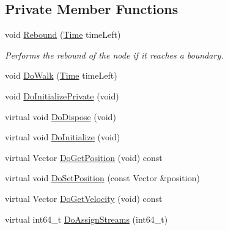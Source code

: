 \subsection*{Private Member Functions}
\begin{DoxyCompactItemize}
\item 
void \hyperlink{classns3_1_1RandomWalk2dMobilityModel_a8cf0179f7646fec7c7f167e00ceb7691}{Rebound} (\hyperlink{classns3_1_1Time}{Time} time\+Left)
\begin{DoxyCompactList}\small\item\em Performs the rebound of the node if it reaches a boundary. \end{DoxyCompactList}\item 
void \hyperlink{classns3_1_1RandomWalk2dMobilityModel_a7264a6530d2c8d2ecef04eda098db5d4}{Do\+Walk} (\hyperlink{classns3_1_1Time}{Time} time\+Left)
\item 
void \hyperlink{classns3_1_1RandomWalk2dMobilityModel_a130059c3aaeeed619641392042bf36c1}{Do\+Initialize\+Private} (void)
\item 
virtual void \hyperlink{classns3_1_1RandomWalk2dMobilityModel_aa25837e6f55a34018da64b4810f6c5cf}{Do\+Dispose} (void)
\item 
virtual void \hyperlink{classns3_1_1RandomWalk2dMobilityModel_a3b8cbd84a8f2e5aced56a37f338369b7}{Do\+Initialize} (void)
\item 
virtual Vector \hyperlink{classns3_1_1RandomWalk2dMobilityModel_a52d12812dbc220e5e94a6664a1e3e425}{Do\+Get\+Position} (void) const 
\item 
virtual void \hyperlink{classns3_1_1RandomWalk2dMobilityModel_a208225b18028947d3153166926fe6811}{Do\+Set\+Position} (const Vector \&position)
\item 
virtual Vector \hyperlink{classns3_1_1RandomWalk2dMobilityModel_a3ac66c0493a71fcdcc9f4f5b863270ea}{Do\+Get\+Velocity} (void) const 
\item 
virtual int64\+\_\+t \hyperlink{classns3_1_1RandomWalk2dMobilityModel_a4d486485f6f810387fea6c15fabe409d}{Do\+Assign\+Streams} (int64\+\_\+t)
\end{DoxyCompactItemize}
